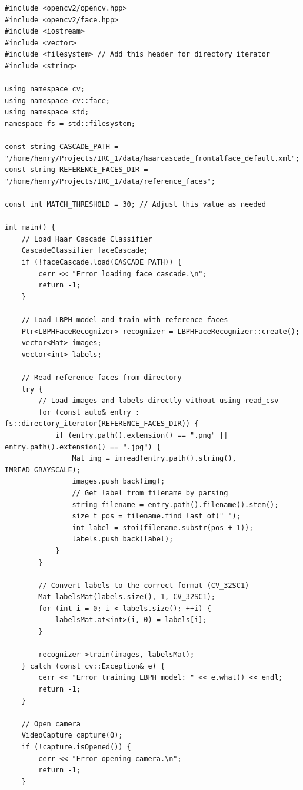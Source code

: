 \documentclass[
]{article}
\begin{document}
\begin{adjustwidth}{-1cm}{-1cm}
\begin{verbatim}
#include <opencv2/opencv.hpp>
#include <opencv2/face.hpp>
#include <iostream>
#include <vector>
#include <filesystem> // Add this header for directory_iterator
#include <string>

using namespace cv;
using namespace cv::face;
using namespace std;
namespace fs = std::filesystem;

const string CASCADE_PATH = "/home/henry/Projects/IRC_1/data/haarcascade_frontalface_default.xml";
const string REFERENCE_FACES_DIR = "/home/henry/Projects/IRC_1/data/reference_faces";

const int MATCH_THRESHOLD = 30; // Adjust this value as needed

int main() {
    // Load Haar Cascade Classifier
    CascadeClassifier faceCascade;
    if (!faceCascade.load(CASCADE_PATH)) {
        cerr << "Error loading face cascade.\n";
        return -1;
    }

    // Load LBPH model and train with reference faces
    Ptr<LBPHFaceRecognizer> recognizer = LBPHFaceRecognizer::create();
    vector<Mat> images;
    vector<int> labels;

    // Read reference faces from directory
    try {
        // Load images and labels directly without using read_csv
        for (const auto& entry : fs::directory_iterator(REFERENCE_FACES_DIR)) {
            if (entry.path().extension() == ".png" || entry.path().extension() == ".jpg") {
                Mat img = imread(entry.path().string(), IMREAD_GRAYSCALE);
                images.push_back(img);
                // Get label from filename by parsing
                string filename = entry.path().filename().stem();
                size_t pos = filename.find_last_of("_");
                int label = stoi(filename.substr(pos + 1));
                labels.push_back(label);
            }
        }
        
        // Convert labels to the correct format (CV_32SC1)
        Mat labelsMat(labels.size(), 1, CV_32SC1);
        for (int i = 0; i < labels.size(); ++i) {
            labelsMat.at<int>(i, 0) = labels[i];
        }

        recognizer->train(images, labelsMat);
    } catch (const cv::Exception& e) {
        cerr << "Error training LBPH model: " << e.what() << endl;
        return -1;
    }

    // Open camera
    VideoCapture capture(0);
    if (!capture.isOpened()) {
        cerr << "Error opening camera.\n";
        return -1;
    }


\end{verbatim}
\end{adjustwidth}
\end{document}
